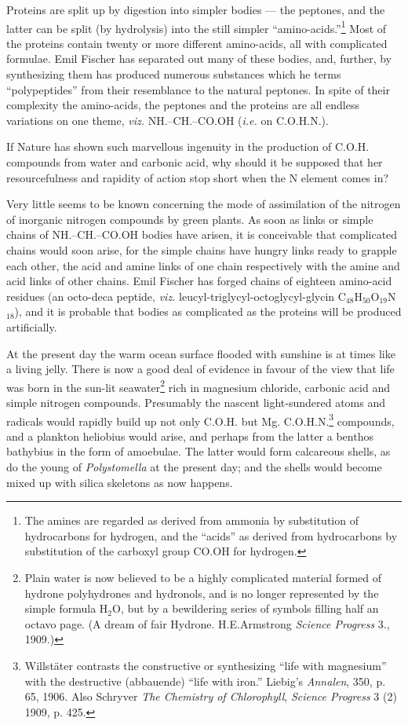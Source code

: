 \documentclass[a4paper, 12pt, oneside]{article}
\begin{document}
Proteins are split up by digestion into simpler bodies --- the peptones, and the latter can be split (by hydrolysis) into the still simpler ``amino-acids.''\footnote{The amines are regarded as derived from ammonia by substitution of hydrocarbons for hydrogen, and the ``acids'' as derived from hydrocarbons by substitution of the carboxyl group CO.OH for hydrogen.} Most of the proteins contain twenty or more different amino-acids, all with complicated formulae. Emil Fischer has separated out many of these bodies, and, further, by synthesizing them has produced numerous substances which he terms ``polypeptides'' from their resemblance to the natural peptones. In spite of their complexity the amino-acids, the peptones and the proteins are all endless variations on one theme, \emph{viz.} NH.--CH.--CO.OH (\emph{i.e.} on C.O.H.N.).

If Nature has shown such marvellous ingenuity in the production of C.O.H. compounds from water and carbonic acid, why should it be supposed that her resourcefulness and rapidity of action stop short when the N element comes in?

Very little seems to be known concerning the mode of assimilation of the nitrogen of inorganic nitrogen compounds by green plants. As soon as links or simple chains of NH.--CH.--CO.OH bodies have arisen, it is conceivable that complicated chains would soon arise, for the simple chains have hungry links ready to grapple each other, the acid and amine links of one chain respectively with the amine and acid links of other chains. Emil Fischer has forged chains of eighteen amino-acid residues (an octo-deca peptide, \emph{viz.} leucyl-triglycyl-octoglycyl-glycin C$_{48}$H$_{50}$O$_{19}$N$_{18}$), and it is probable that bodies as complicated as the proteins will be produced artificially.

At the present day the warm ocean surface flooded with sunshine is at times like a living jelly. There is now a good deal of evidence in favour of the view that life was born in the sun-lit seawater\footnote{Plain water is now believed to be a highly complicated material formed of hydrone polyhydrones and hydronols, and is no longer represented by the simple formula H$_{2}$O, but by a bewildering series of symbols filling half an octavo page. (A dream of fair Hydrone. H.E.Armstrong \emph{Science Progress} 3., 1909.)} rich in magnesium chloride, carbonic acid and simple nitrogen compounds. Presumably the nascent light-sundered atoms and radicals would rapidly build up not only C.O.H. but Mg. C.O.H.N.\footnote{Willstäter contrasts the constructive or synthesizing ``life with magnesium'' with the destructive (abbauende) ``life with iron.'' Liebig's \emph{Annalen}, 350, p. 65, 1906. Also Schryver \emph{The Chemistry of Chlorophyll}, \emph{Science Progress} 3 (2) 1909, p. 425.} compounds, and a plankton heliobius would arise, and perhaps from the latter a benthos bathybius in the form of amoebulae. The latter would form calcareous shells, as do the young of \emph{Polystomella} at the present day; and the shells would become mixed up with silica skeletons as now happens.
\end{document}
